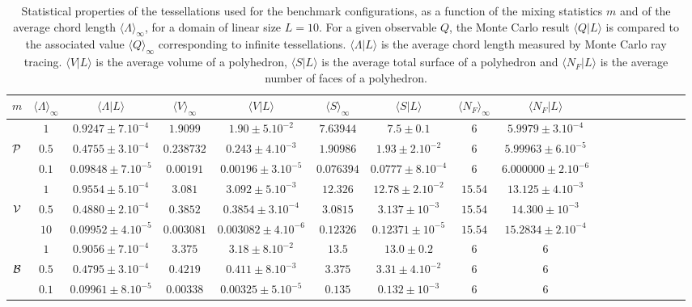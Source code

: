 \documentclass[final,authoryear,5p,times,twocolumn]{elsarticle}
\begin{document}
\clearpage

\begin{table*}
\begin{center}
\begin{tabular}{ccccccccccccccccc}
\toprule
$m$ & ${\langle \Lambda \rangle}_{\infty}$ & $\langle \Lambda | L\rangle$ & ${\langle V \rangle}_{\infty}$ & $\langle V | L \rangle$ & ${\langle S \rangle}_{\infty}$ & $\langle S | L \rangle$ & ${\langle N_F \rangle}_{\infty}$ & $\langle N_F | L \rangle$ \\
 \midrule
& $1$ & $0.9247 \pm 7.10^{-4}$ & $1.9099$ & $1.90 \pm 5.10^{-2}$ & $7.63944$ & $7.5 \pm 0.1$  & $6$ & $5.9979 \pm 3.10^{-4}$ \\
${\cal P}$ & $0.5$ & $0.4755 \pm 3.10^{-4}$ & $0.238732$ & $0.243 \pm 4.10^{-3}$ & $1.90986$ & $1.93 \pm 2.10^{-2}$ & $6$ & $5.99963 \pm 6.10^{-5}$  \\
& $0.1$ & $0.09848 \pm 7.10^{-5}$ &  $0.00191$ & $0.00196 \pm 3.10^{-5}$ & $0.076394$ & $0.0777 \pm 8.10^{-4}$  & $6$ & $6.000000 \pm 2.10^{-6}$ \\
\midrule
& $1$ & $0.9554 \pm 5.10^{-4}$ & $3.081$ & $3.092 \pm 5.10^{-3}$  & $12.326$ & $12.78 \pm 2.10^{-2}$ & $15.54$ & $13.125 \pm 4.10^{-3}$   \\
${\cal V}$ & $0.5$ & $0.4880 \pm 2.10^{-4}$ & $0.3852$ & $0.3854 \pm 3.10^{-4}$ & $3.0815$ & $3.137 \pm 10^{-3}$ & $15.54$ & $14.300 \pm 10^{-3}$\\
& $10$ & $0.09952 \pm 4.10^{-5}$ &  $0.003081$ & $0.003082 \pm 4 .10^{-6}$  &  $0.12326$ & $0.12371 \pm 10^{-5}$ & $15.54$ & $15.2834 \pm 2.10^{-4}$ \\
\midrule
& $1$ & $0.9056 \pm 7.10^{-4}$ & $3.375$ & $3.18 \pm 8.10^{-2}$ & $13.5$  & $13.0 \pm 0.2$ & $6$ & $6$  \\
${\cal B}$ & $0.5$ & $0.4795 \pm 3.10^{-4}$ & $0.4219$ & $0.411 \pm 8.10^{-3}$ & $3.375$ & $3.31 \pm 4.10^{-2}$ & $6$ & $6$  \\
& $0.1$ & $0.09961 \pm 8.10^{-5}$ & $0.00338$ & $0.00325 \pm 5.10^{-5}$ & $0.135$ & $0.132 \pm 10^{-3}$ & $6$ & $6$  \\
\bottomrule
\end{tabular}
\end{center}
\caption{Statistical properties of the tessellations used for the benchmark configurations, as a function of the mixing statistics $m$ and of the average chord length ${\langle \Lambda \rangle}_{\infty}$, for a domain of linear size $L=10$. For a given observable $Q$, the Monte Carlo result $\langle Q | L \rangle$ is compared to the associated value ${\langle Q \rangle}_{\infty}$ corresponding to infinite tessellations. $\langle \Lambda | L \rangle$ is the average chord length measured by Monte Carlo ray tracing. $\langle V | L \rangle$ is the average volume of a polyhedron, $\langle S | L \rangle$ is the average total surface of a polyhedron and $\langle N_F | L \rangle$ is the average number of faces of a polyhedron.}
\label{tab_geo}
\end{table*}
\end{document}
